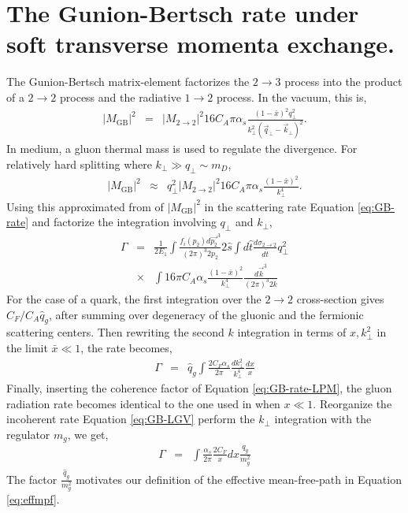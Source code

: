 \documentclass[aps, prc, reprint, amsmath, groupedaddress, nofootinbib]{revtex4-1}
\begin{document}
\section{The Gunion-Bertsch rate under soft transverse momenta exchange.}
\label{app:consistency}
The Gunion-Bertsch matrix-element factorizes the $2\rightarrow3$ process into the product of a $2\rightarrow2$ process and the radiative $1\rightarrow 2$ process. 
In the vacuum, this is,
\begin{eqnarray}
|M_{\textrm{GB}}|^2 &=& |M_{2\rightarrow 2}|^2 16 C_A \pi \alpha_s \frac{(1-\bar{x})^2q_\perp^2}{k_\perp^2\left(\vec{q}_\perp-\vec{k}_\perp\right)^2}.
\end{eqnarray}
In medium, a gluon thermal mass is used to regulate the divergence. 
For relatively hard splitting where $k_\perp \gg q_\perp \sim m_D$, 
\begin{eqnarray}
|M_{\textrm{GB}}|^2 &\approx & q_\perp^2 |M_{2\rightarrow 2}|^2 16 C_A \pi \alpha_s \frac{(1-\bar{x})^2}{k_\perp^4}.
\end{eqnarray}
Using this approximated from of $|M_{\textrm{GB}}|^2$ in the scattering rate Equation \ref{eq:GB-rate} and factorize the integration involving $q_\perp$ and $k_\perp$,
\begin{eqnarray}
\Gamma &=& \frac{1}{2E_1}\int\frac{f_i(p_2)d\vec{p_2}^3}{(2\pi)^3 2p_2}2\hat{s}\int d\hat{t}\frac{d\sigma_{2\rightarrow 2}}{d\hat{t}}q_\perp^2
\nonumber \\
&\times& \int 16\pi C_A \alpha_s \frac{(1-\bar{x})^2}{k_\perp^4} \frac{d\vec{k}^3}{(2\pi)^3 2k}
\end{eqnarray}
For the case of a quark, the first integration over the $2\rightarrow 2$ cross-section gives $C_F/C_A\hat{q}_g$, after summing over degeneracy of the gluonic and the fermionic scattering centers.
Then rewriting the second $k$ integration in terms of $x, k_\perp^2$ in the limit $\bar{x}\ll 1$, the rate becomes,
\begin{eqnarray}\label{eq:GB-LGV}
\Gamma &=& \hat{q}_g \int \frac{2C_F\alpha_s}{2\pi} \frac{dk_\perp^2}{k_\perp^4} \frac{dx}{x}
\end{eqnarray}
Finally, inserting the coherence factor of Equation \ref{eq:GB-rate-LPM}, the gluon radiation rate becomes identical to the one used in \cite{Cao:2013ita} when $x\ll 1$.
Reorganize the incoherent rate Equation \ref{eq:GB-LGV} perform the $k_\perp$ integration with the regulator $m_g$, we get,
\begin{eqnarray}
\Gamma &=& \int \frac{\alpha_s}{2\pi} \frac{2C_F}{x}dx \frac{q_g}{m_g^2} 
\end{eqnarray}
The factor $\frac{\hat{q}_g}{m_g^2}$ motivates our definition of the effective mean-free-path in Equation \ref{eq:effmpf}.
\end{document}
